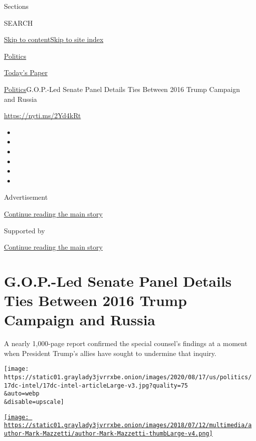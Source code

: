 Sections

SEARCH

\protect\hyperlink{site-content}{Skip to
content}\protect\hyperlink{site-index}{Skip to site index}

\href{https://www.nytimes3xbfgragh.onion/section/politics}{Politics}

\href{https://myaccount.nytimes3xbfgragh.onion/auth/login?response_type=cookie\&client_id=vi}{}

\href{https://www.nytimes3xbfgragh.onion/section/todayspaper}{Today's
Paper}

\href{/section/politics}{Politics}\textbar{}G.O.P.-Led Senate Panel
Details Ties Between 2016 Trump Campaign and Russia

\url{https://nyti.ms/2Yd4kRt}

\begin{itemize}
\item
\item
\item
\item
\item
\item
\end{itemize}

Advertisement

\protect\hyperlink{after-top}{Continue reading the main story}

Supported by

\protect\hyperlink{after-sponsor}{Continue reading the main story}

\hypertarget{gop-led-senate-panel-details-ties-between-2016-trump-campaign-and-russia}{%
\section{G.O.P.-Led Senate Panel Details Ties Between 2016 Trump
Campaign and
Russia}\label{gop-led-senate-panel-details-ties-between-2016-trump-campaign-and-russia}}

A nearly 1,000-page report confirmed the special counsel's findings at a
moment when President Trump's allies have sought to undermine that
inquiry.

\texttt{[image: https://static01.graylady3jvrrxbe.onion/images/2020/08/17/us/politics/17dc-intel/17dc-intel-articleLarge-v3.jpg?quality=75\\\&auto=webp\\\&disable=upscale]}

\href{https://www.nytimes3xbfgragh.onion/by/mark-mazzetti}{\texttt{[image: https://static01.graylady3jvrrxbe.onion/images/2018/07/12/multimedia/author-Mark-Mazzetti/author-Mark-Mazzetti-thumbLarge-v4.png]}}

